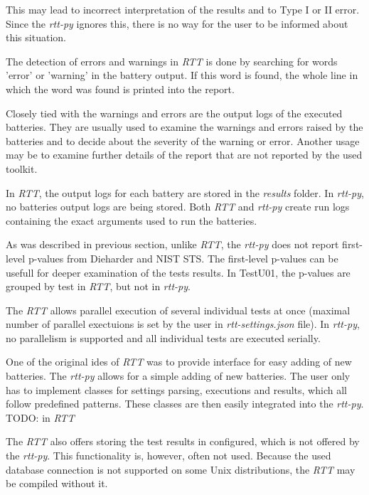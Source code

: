 \documentclass[
  digital,     %
  oneside,     %
  nosansbold,  %
  nocolorbold, %
  nolof,         %
  nolot,         %
]{fithesis4}
\begin{document}
This may lead to incorrect interpretation of the results and to Type I or II error. Since the \emph{rtt-py} ignores this, there is no way for the user to be informed about this situation.

The detection of errors and warnings in \emph{RTT} is done by searching for words 'error' or 'warning' in the battery output. If this word is found, the whole line in which the word was found is printed into the report. 

Closely tied with the warnings and errors are the output logs of the executed batteries. They are usually used to examine the warnings and errors raised by the batteries and to decide about the severity of the warning or error. Another usage may be to examine further details of the report that are not reported by the used toolkit. 

In \emph{RTT}, the output logs for each battery are stored in the \emph{results} folder. In \emph{rtt-py}, no batteries output logs are being stored. Both \emph{RTT} and \emph{rtt-py} create run logs containing the exact arguments used to run the batteries.

As was described in previous section, unlike \emph{RTT}, the \emph{rtt-py} does not report first-level p-values from Dieharder and NIST STS. The first-level p-values can be usefull for deeper examination of the tests results. In TestU01, the p-values are grouped by test in \emph{RTT}, but not in \emph{rtt-py}.

The \emph{RTT} allows parallel execution of several individual tests at once (maximal number of parallel exectuions is set by the user in \emph{rtt-settings.json} file). In \emph{rtt-py}, no parallelism is supported and all individual tests are executed serially. 

One of the original ides of \emph{RTT} was to provide interface for easy adding of new batteries. The \emph{rtt-py} allows for a simple adding of new batteries. The user only has to implement classes for settings parsing, executions and results, which all follow predefined patterns. These classes are then easily integrated into the \emph{rtt-py}. TODO: in \emph{RTT}

The \emph{RTT} also offers storing the test results in configured, which is not offered by the \emph{rtt-py}. This functionality is, however, often not used. Because the used database connection is not supported on some Unix distributions, the \emph{RTT} may be compiled without it.
\end{document}

